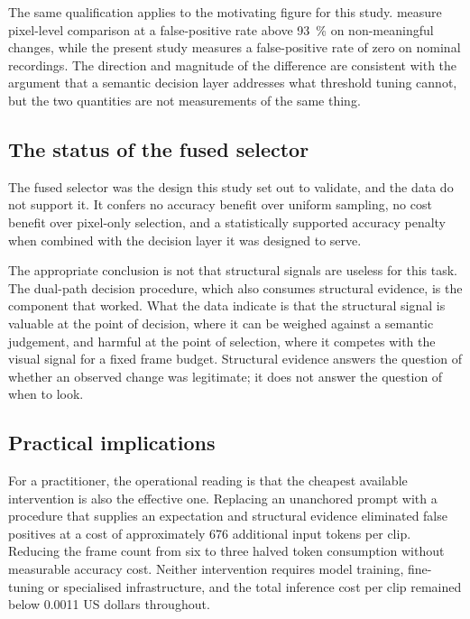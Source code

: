 The same qualification applies to the motivating figure for this study.
\citet{zhang2026beyond} measure pixel-level comparison at a false-positive
rate above \SI{93}{\percent} on non-meaningful changes, while the present
study measures a false-positive rate of zero on nominal recordings. The
direction and magnitude of the difference are consistent with the argument
that a semantic decision layer addresses what threshold tuning cannot, but
the two quantities are not measurements of the same thing.

\subsection{The status of the fused selector}

The fused selector was the design this study set out to validate, and the
data do not support it. It confers no accuracy benefit over uniform
sampling, no cost benefit over pixel-only selection, and a statistically
supported accuracy penalty when combined with the decision layer it was
designed to serve.

The appropriate conclusion is not that structural signals are useless for
this task. The dual-path decision procedure, which also consumes
structural evidence, is the component that worked. What the data indicate
is that the structural signal is valuable at the point of decision, where
it can be weighed against a semantic judgement, and harmful at the point
of selection, where it competes with the visual signal for a fixed frame
budget. Structural evidence answers the question of whether an observed
change was legitimate; it does not answer the question of when to look.

\subsection{Practical implications}

For a practitioner, the operational reading is that the cheapest available
intervention is also the effective one. Replacing an unanchored prompt
with a procedure that supplies an expectation and structural evidence
eliminated false positives at a cost of approximately 676 additional input
tokens per clip. Reducing the frame count from six to three halved token
consumption without measurable accuracy cost. Neither intervention
requires model training, fine-tuning or specialised infrastructure, and
the total inference cost per clip remained below
\num{0.0011} US dollars throughout.


